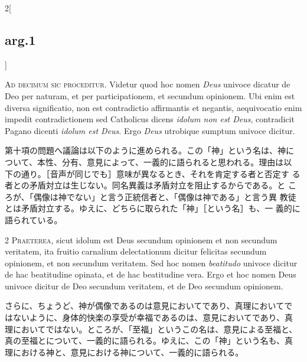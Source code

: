 \documentclass[paper=a4paper,fontsize=10pt,jafontsize=9pt,titlepage]{jlreq}
\begin{document}
\begin{paracol}{2}[\subsection{arg.1}]

{\huge A}{\scshape d decimum sic proceditur}. Videtur quod hoc nomen
{\itshape Deus} univoce dicatur de Deo per naturam, et per
participationem, et secundum opinionem. Ubi enim est diversa
significatio, non est contradictio affirmantis et negantis,
aequivocatio enim impedit contradictionem sed Catholicus dicens
{\itshape idolum non est Deus}, contradicit Pagano dicenti {\itshape
idolum est Deus}. Ergo {\itshape Deus} utrobique sumptum univoce
dicitur.

\switchcolumn

第十項の問題へ議論は以下のように進められる。この「神」という名は、神に
ついて、本性、分有、意見によって、一義的に語られると思われる。理由は以
下の通り。［音声が同じでも］意味が異なるとき、それを肯定する者と否定す
る者との矛盾対立は生じない。同名異義は矛盾対立を阻止するからである。と
ころが、「偶像は神でない」と言う正統信者と、「偶像は神である」と言う異
教徒とは矛盾対立する。ゆえに、どちらに取られた「神」［という名］も、一
義的に語られている。


{\scshape 2 Praeterea}, sicut idolum est Deus secundum opinionem et
non secundum veritatem, ita fruitio carnalium delectationum dicitur
felicitas secundum opinionem, et non secundum veritatem. Sed hoc nomen
{\itshape beatitudo} univoce dicitur de hac beatitudine opinata, et de
hac beatitudine vera. Ergo et hoc nomen Deus univoce dicitur de Deo
secundum veritatem, et de Deo secundum opinionem.

\switchcolumn

さらに、ちょうど、神が偶像であるのは意見においてであり、真理においてで
はないように、身体的快楽の享受が幸福であるのは、意見においてであり、真
理においてではない。ところが、「至福」というこの名は、意見による至福と、
真の至福とについて、一義的に語られる。ゆえに、この「神」という名も、真
理における神と、意見における神について、一義的に語られる。



\end{paracol}
\end{document}
